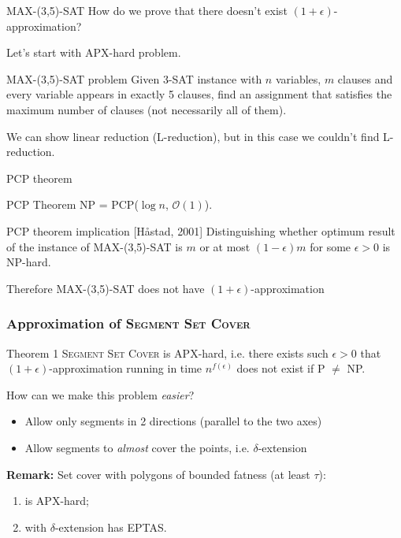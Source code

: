 \documentclass{beamer}
\begin{document}
\begin{frame}{\textsc{MAX-(3,5)-SAT}}
How do we prove that there doesn't exist $(1+\epsilon)$-approximation?

Let's start with APX-hard problem.

\begin{block}{\textsc{MAX-(3,5)-SAT} problem}
Given 3-SAT instance with $n$ variables, $m$ clauses
and every variable appears in exactly 5 clauses,
find an assignment
that satisfies the maximum number of clauses
(not necessarily all of them).
\end{block}

\pause
We can show linear reduction (L-reduction),
but in this case we couldn't find L-reduction.

\end{frame}

\begin{frame}{PCP theorem}

\begin{block}{PCP Theorem}
NP = PCP($\log n$, $\mathcal{O}(1)$).
\end{block}

\begin{block}{PCP theorem implication [Håstad, 2001]}
Distinguishing whether optimum result of
the instance of MAX-(3,5)-SAT is $m$
or at most $(1-\epsilon)m$ for some $\epsilon > 0$ is NP-hard.
\end{block}

Therefore MAX-(3,5)-SAT does not have
$(1+\epsilon)$-approximation
\end{frame}


\begin{frame}
\frametitle{Approximation of \textsc{Segment Set Cover}}
\begin{block}{Theorem 1}
	\textsc{Segment Set Cover} is APX-hard, i.e.
	there exists such $\epsilon>0$
	that $(1+\epsilon)$-approximation 
	running in time $n^{f(\epsilon)}$ does not exist if P $\neq$ NP.
\end{block}

How can we make this problem \textit{easier}?
\begin{itemize}
\item Allow only segments in 2 directions (parallel to the two axes)
\item Allow segments to \textit{almost} cover the points, i.e. $\delta$-extension
\end{itemize}

\pause

\bigskip

\textbf{Remark:}
	Set cover with polygons of bounded fatness (at least $\tau$):
	\begin{enumerate}
	\item is APX-hard;
	\item with $\delta$-extension has EPTAS.
	\end{enumerate}

\end{frame}
\end{document}
